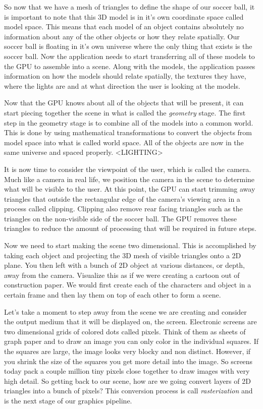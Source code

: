 \documentclass[12pt] {article}
\begin{document}
So now that we have a mesh of triangles to define the shape of our soccer ball, it is important to note that this 3D model is in it's own coordinate space called model space. This means that each model of an object contains absolutely no information about any of the other objects or how they relate spatially. Our soccer ball is floating in it's own universe where the only thing that exists is the soccer ball. Now the application needs to start transferring all of these models to the GPU to assemble into a scene. Along with the models, the application passes information on how the models should relate spatially, the textures they have, where the lights are and at what direction the user is looking at the models.

Now that the GPU knows about all of the objects that will be present, it can start piecing together the scene in what is called the \emph{geometry} stage. The first step in the geometry stage is to combine all of the models into a common world. This is done by using mathematical transformations to convert the objects from model space into what is called world space. All of the objects are now in the same universe and spaced properly. <LIGHTING>

It is now time to consider the viewpoint of the user, which is called the camera. Much like a camera in real life, we position the camera in the scene to determine what will be visible to the user. At this point, the GPU can start trimming away triangles that outside the rectangular edge of the camera's viewing area in a process called clipping. Clipping also remove rear facing triangles such as the triangles on the non-visible side of the soccer ball. The GPU removes these triangles to reduce the amount of processing that will be required in future steps.

Now we need to start making the scene two dimensional. This is accomplished by taking each object and projecting the 3D mesh of visible triangles onto a 2D plane. You then left with a bunch of 2D object at various distances, or depth, away from the camera. Visualize this as if we were creating a cartoon out of construction paper. We would first create each of the characters and object in a certain frame and then lay them on top of each other to form a scene. 


Let's take a moment to step away from the scene we are creating and consider the output medium that it will be displayed on, the screen. Electronic screens are two dimensional grids of colored dots called pixels. Think of them as sheets of graph paper and to draw an image you can only color in the individual squares. If the squares are large, the image looks very blocky and non distinct. However, if you shrink the size of the squares you get more detail into the image. So screens today pack a couple million tiny pixels close together to draw images with very high detail. So getting back to our scene, how are we going convert layers of 2D triangles into a bunch of pixels? This conversion process is call \emph{rasterization} and is the next stage of our graphics pipeline.
\end{document}
